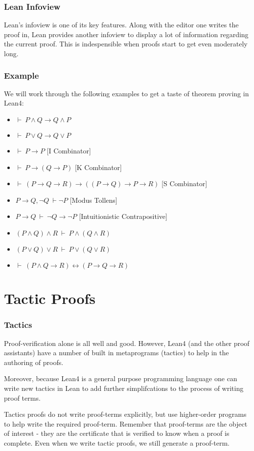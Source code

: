 \documentclass{beamer}
\theoremstyle{indentDefn} \newtheorem{defn}[]{Definition}
\begin{document}
\begin{frame}
\frametitle{Lean Infoview}

Lean's infoview is one of its key features. Along with the editor one writes the proof in, Lean provides another infoview to display a lot of information regarding the current proof. This is indespensible when proofs start to get even moderately long. 


\end{frame}

\begin{frame}
\frametitle{Example}
We will work through the following examples to get a taste of theorem proving in Lean4:

\begin{itemize}
	\item[] $\vdash \ P \land Q \to Q \land P$
	\item[] $\vdash \ P \lor Q \to Q \lor P$
	\item[] $\vdash \ P \to P$ [I Combinator]
	\item[] $\vdash \ P \to (Q \to P)$ [K Combinator]
	\item[] $\vdash \ (P \to Q \to R) \to ((P \to Q) \to P \to R)$ [S Combinator]
	\item[] $P \to Q, \lnot Q \ \vdash \lnot P$ [Modus Tollens]
	\item[] $P \to Q \ \vdash \ \lnot Q \to \lnot P$ [Intuitionistic Contrapositive]
	\item[] $(P \land Q) \land R \ \vdash \ P \land (Q \land R)$
	\item[] $(P \lor Q) \lor R \ \vdash \ P \lor (Q \lor R)$
	\item[] $\vdash \ (P \land Q \to R) \leftrightarrow (P \to Q \to R)$
\end{itemize}
\end{frame}

\section{Tactic Proofs}
\begin{frame}
	\frametitle{Tactics}
	
	Proof-verification alone is all well and good. However, Lean4 (and the other proof assistants) have a number of built in metaprograms (tactics) to help in the authoring of proofs. 
	
	Moreover, because Lean4 is a general purpose programming language one can write new tactics in Lean to add further simplifcations to the process of writing proof terms.
	
	Tactics proofs do not write proof-terms explicitly, but use higher-order programs to help write the required proof-term. Remember that proof-terms are the object of interest - they are the certificate that is verified to know when a proof is complete. Even when we write tactic proofs, we still generate a proof-term.
\end{frame}
\end{document}
